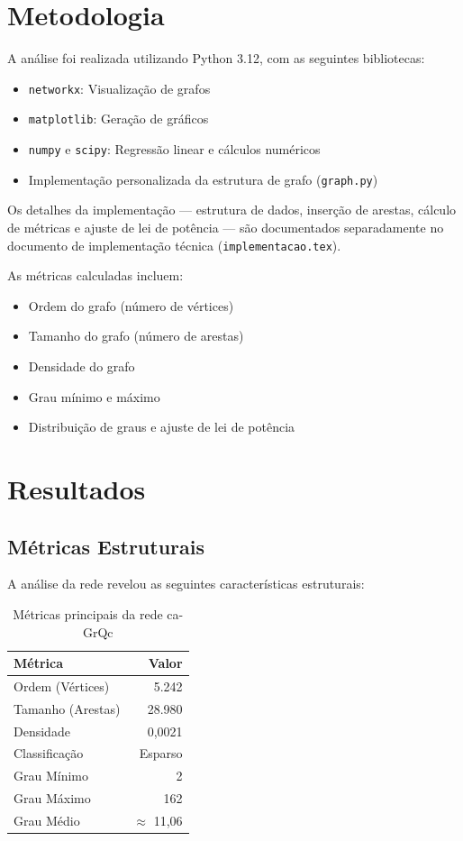 \documentclass[12pt,a4paper]{article}
\begin{document}
\section{Metodologia}

A análise foi realizada utilizando Python 3.12, com as seguintes bibliotecas:

\begin{itemize}
    \item \texttt{networkx}: Visualização de grafos
    \item \texttt{matplotlib}: Geração de gráficos
    \item \texttt{numpy} e \texttt{scipy}: Regressão linear e cálculos numéricos
    \item Implementação personalizada da estrutura de grafo (\texttt{graph.py})
\end{itemize}

Os detalhes da implementação — estrutura de dados, inserção de arestas, cálculo de métricas e ajuste de lei de potência — são documentados separadamente no documento de implementação técnica (\texttt{implementacao.tex}).

As métricas calculadas incluem:
\begin{itemize}
    \item Ordem do grafo (número de vértices)
    \item Tamanho do grafo (número de arestas)
    \item Densidade do grafo
    \item Grau mínimo e máximo
    \item Distribuição de graus e ajuste de lei de potência
\end{itemize}

\section{Resultados}

\subsection{Métricas Estruturais}


A análise da rede revelou as seguintes características estruturais:

\begin{table}[H]
\centering
\caption{Métricas principais da rede ca-GrQc}
\begin{tabular}{|l|r|}
\hline
\textbf{Métrica} & \textbf{Valor} \\
\hline
Ordem (Vértices) & 5.242 \\
Tamanho (Arestas) & 28.980 \\
Densidade & 0,0021 \\
Classificação & Esparso \\
Grau Mínimo & 2 \\
Grau Máximo & 162 \\
Grau Médio & $\approx$ 11,06 \\
\hline
\end{tabular}
\end{table}
\end{document}
